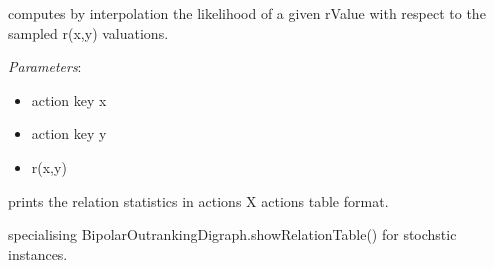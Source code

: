 \documentclass[letterpaper,10pt,english]{sphinxmanual}
\begin{document}
\begin{fulllineitems}
\begin{fulllineitems}
\label{techDoc:outrankingDigraphs.StochasticBipolarOutrankingDigraph.computeCDF}
computes by interpolation the likelihood of a given rValue with respect to the sampled r(x,y) valuations.

\emph{Parameters}:
\begin{itemize}
\item {} 
action key x

\item {} 
action key y

\item {} 
r(x,y)

\end{itemize}

\end{fulllineitems}


\begin{fulllineitems}
\label{techDoc:outrankingDigraphs.StochasticBipolarOutrankingDigraph.showRelationStatistics}
prints the relation statistics in actions X actions table format.

\end{fulllineitems}


\begin{fulllineitems}
\label{techDoc:outrankingDigraphs.StochasticBipolarOutrankingDigraph.showRelationTable}
specialising BipolarOutrankingDigraph.showRelationTable() for stochstic instances.

\end{fulllineitems}


\end{fulllineitems}

\end{document}
